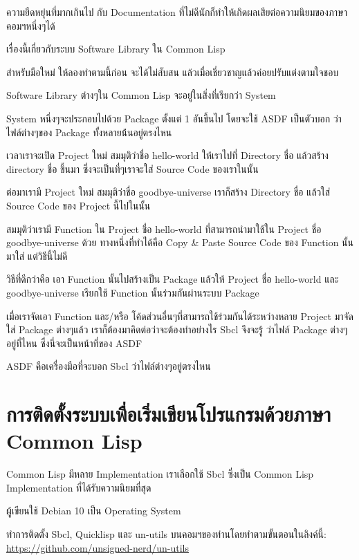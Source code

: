 \documentclass[a4paper]{article}
\begin{document}
ความยืดหยุ่นที่มากเกินไป กับ Documentation ที่ไม่ดีนักก็ทำให้เกิดผลเสียต่อความนิยมของภาษา%
คอมฯหนึ่งๆได้

เรื่องนี้เกี่ยวกับระบบ Software Library ใน Common Lisp

สำหรับมือใหม่ ให้ลองทำตามนี้ก่อน จะได้ไม่สับสน แล้วเมื่อเชี่ยวชาญแล้วค่อยปรับแต่งตามใจชอบ

Software Library ต่างๆใน Common Lisp จะอยู่ในสิ่งที่เรียกว่า System

System หนึ่งๆจะประกอบไปด้วย Package ตั้งแต่ 1 อันขึ้นไป โดยจะใช้ ASDF เป็นตัวบอก%
ว่าไฟล์ต่างๆของ Package ทั้งหลายน้้นอยู่ตรงไหน


เวลาเราจะเปิด Project ใหม่ สมมุติว่าชื่อ hello-world ให้เราไปที่ Directory ชื่อ
 แล้วสร้าง directory ชื่อ  ขึ้นมา
ซึ่งจะเป็นที่ๆเราจะใส่ Source Code ของเราในนั้น

ต่อมาเรามี Project ใหม่ สมมุติว่าชื่อ goodbye-universe เราก็สร้าง Directory ชื่อ
 แล้วใส่ Source Code ของ Project
นี้ไปในนั้น

สมมุติว่าเรามี Function ใน Project ชื่อ hello-world ที่สามารถนำมาใช้ใน Project ชื่อ
goodbye-universe ด้วย ทางหนึ่งที่ทำได้คือ Copy \& Paste Source Code ของ
Function นั้นมาใส่ แต่วิธีนี้ไม่ดี

วิธีที่ดีกว่าคือ เอา Function นั้นไปสร้างเป็น Package แล้วให้ Project ชื่อ
hello-world และ goodbye-universe เรียกใช้ Function นั้นร่วมกันผ่านระบบ Package

เมื่อเราจัดเอา Function และ/หรือ โค้ดส่วนอื่นๆที่สามารถใช้ร่วมกันได้ระหว่างหลาย
Project มาจัดใส่ Package ต่างๆแล้ว เราก็ต้องมาคิดต่อว่าจะต้องทำอย่างไร Sbcl จึงจะรู้%
ว่าไฟล์ Package ต่างๆอยู่ที่ไหน ซึ่งนี่จะเป็นหน้าที่ของ ASDF

ASDF คือเครื่องมือที่จะบอก Sbcl ว่าไฟล์ต่างๆอยู่ตรงไหน


\section{การติดตั้งระบบเพื่อเริ่มเขียนโปรแกรมด้วยภาษา Common Lisp}

Common Lisp มีหลาย Implementation เราเลือกใช้ Sbcl ซึ่งเป็น Common Lisp Implementation ที่ได้รับความนิยมที่สุด

ผู้เขียนใช้ Debian 10 เป็น Operating System

ทำการติดตั้ง Sbcl, Quicklisp และ un-utils บนคอมฯของท่านโดยทำตามขั้นตอนในลิงค์นี้:
\href{https://github.com/unsigned-nerd/un-utils}{https://github.com/unsigned-nerd/un-utils}
\end{document}
